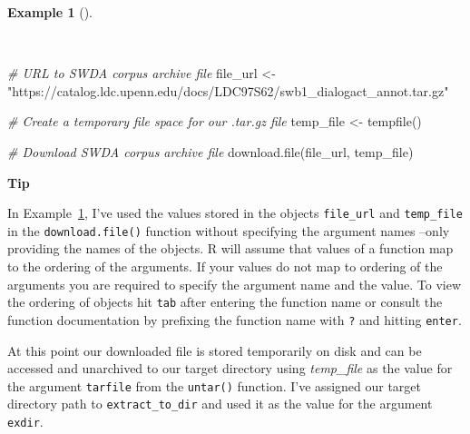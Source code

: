 \documentclass[
  letterpaper,
  krantz1]{latex/krantz-mod}
\newenvironment{Shaded}{\begin{snugshade}}{\end{snugshade}}
\newcommand{\CommentTok}[1]{\textcolor[rgb]{0.00,0.00,0.00}{\textit{#1}}}
\newcommand{\FunctionTok}[1]{\textcolor[rgb]{0.00,0.00,0.00}{#1}}
\newcommand{\NormalTok}[1]{\textcolor[rgb]{0.00,0.00,0.00}{#1}}
\newcommand{\OtherTok}[1]{\textcolor[rgb]{0.00,0.00,0.00}{#1}}
\newcommand{\StringTok}[1]{\textcolor[rgb]{0.00,0.00,0.00}{#1}}
\theoremstyle{definition}
\newtheorem{example}{Example}[chapter]
\theoremstyle{definition}
\theoremstyle{remark}
\begin{document}
\pagebreak

\begin{example}[]\protect\hypertarget{exm-acquire-swda-temp-file}{}\label{exm-acquire-swda-temp-file}

~

\begin{Shaded}
\begin{Highlighting}[numbers=left,,]
\CommentTok{\# URL to SWDA corpus archive file}
\NormalTok{file\_url }\OtherTok{\textless{}{-}}
  \StringTok{"https://catalog.ldc.upenn.edu/docs/LDC97S62/swb1\_dialogact\_annot.tar.gz"}

\CommentTok{\# Create a temporary file space for our .tar.gz file}
\NormalTok{temp\_file }\OtherTok{\textless{}{-}} \FunctionTok{tempfile}\NormalTok{()}

\CommentTok{\# Download SWDA corpus archive file}
\FunctionTok{download.file}\NormalTok{(file\_url, temp\_file)}
\end{Highlighting}
\end{Shaded}

\end{example}

\begin{tcolorbox}[enhanced jigsaw, leftrule=.75mm, colframe=quarto-callout-color-frame, left=2mm, colback=white, toprule=.15mm, breakable, arc=.35mm, opacityback=0, bottomrule=.15mm, rightrule=.15mm]

\textbf{ Tip}

In Example~\ref{exm-acquire-swda-temp-file}, I've used the values stored
in the objects \texttt{file\_url} and \texttt{temp\_file} in the
\texttt{download.file()} function without specifying the argument names
--only providing the names of the objects. R will assume that values of
a function map to the ordering of the arguments. If your values do not
map to ordering of the arguments you are required to specify the
argument name and the value. To view the ordering of objects hit
\texttt{tab} after entering the function name or consult the function
documentation by prefixing the function name with \texttt{?} and hitting
\texttt{enter}.

\end{tcolorbox}

At this point our downloaded file is stored temporarily on disk and can
be accessed and unarchived to our target directory using
\emph{temp\_file} as the value for the argument \texttt{tarfile} from
the \texttt{untar()} function. I've assigned our target directory path
to \texttt{extract\_to\_dir} and used it as the value for the argument
\texttt{exdir}.
\end{document}
